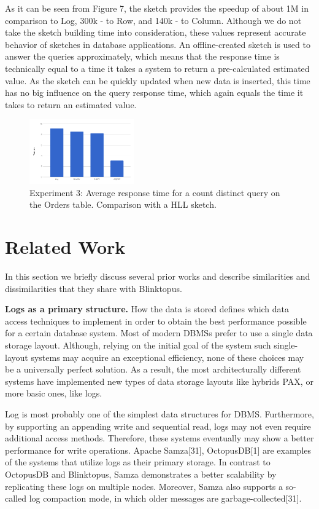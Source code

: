 \documentclass[10pt, conference, compsocconf]{IEEEtran}
\begin{document}
As it can be seen from Figure 7, the sketch provides the speedup of about 1M in comparison to Log, 300k - to Row, and 140k - to Column. Although we do not take the sketch building time into consideration, these values represent accurate behavior of sketches in database applications. An offline-created sketch is used to answer the queries approximately, which means that the response time is technically equal to a time it takes a system to return a pre-calculated estimated value. As the sketch can be quickly updated when new data is inserted, this time has no big influence on the query response time, which again equals the time it takes to return an estimated value.

\begin{figure} \includegraphics[width=0.4\textwidth, center]{img/exp3.png} 
\caption{Experiment 3: Average response time for a count distinct query on the Orders table. Comparison with a HLL sketch.}
\end{figure}

\section{Related Work}
In this section we briefly discuss several prior works and describe similarities and dissimilarities that they share with Blinktopus.

\textbf{Logs as a primary structure.} How the data is stored defines which data access techniques to implement in order to obtain the best performance possible for a certain database system. Most of modern DBMSs prefer to use a single data storage layout. Although, relying on the initial goal of the system such single-layout systems may acquire an exceptional efficiency, none of these choices may be a universally perfect solution. As a result, the most architecturally different systems have implemented new types of data storage layouts like hybrids PAX, or more basic ones, like logs. 

Log is most probably one of the simplest data structures for DBMS. Furthermore, by supporting an appending write and sequential read, logs may not even require additional access methods. Therefore, these systems eventually may show a better performance for write operations. Apache Samza[31], OctopusDB[1] are examples of the systems that utilize logs as their primary storage. In contrast to OctopusDB and Blinktopus, Samza demonstrates a better scalability by replicating these logs on multiple nodes. Moreover, Samza also supports a so-called log compaction mode, in which older messages are garbage-collected[31].
\end{document}
